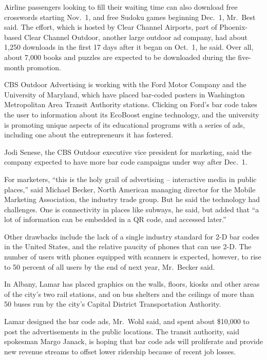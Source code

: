 ﻿\documentclass[12pt]{article}
\begin{document}
Airline passengers looking to fill their waiting time can also download free crosswords starting
Nov.~1, and free Sudoku games beginning Dec.~1, Mr.~Best said. The effort, which is hosted by Clear
Channel Airports, part of Phoenix-based Clear Channel Outdoor, another large outdoor ad company, had
about 1,250 downloads in the first 17 days after it began on Oct.~1, he said. Over all, about 7,000
books and puzzles are expected to be downloaded during the five-month promotion.

CBS Outdoor Advertising is working with the Ford Motor Company and the University of Maryland, which
have placed bar-coded posters in Washington Metropolitan Area Transit Authority stations. Clicking
on Ford's bar code takes the user to information about its EcoBoost engine technology, and the
university is promoting unique aspects of its educational programs with a series of ads, including
one about the entrepreneurs it has fostered.

Jodi Senese, the CBS Outdoor executive vice president for marketing, said the company expected to
have more bar code campaigns under way after Dec.~1.

For marketers, ``this is the holy grail of advertising -- interactive media in public places,'' said
Michael Becker, North American managing director for the Mobile Marketing Association, the industry
trade group. But he said the technology had challenges. One is connectivity in places like subways,
he said, but added that ``a lot of information can be embedded in a QR code, and accessed later.''

Other drawbacks include the lack of a single industry standard for 2-D bar codes in the United
States, and the relative paucity of phones that can use 2-D. The number of users with phones
equipped with scanners is expected, however, to rise to 50 percent of all users by the end of next
year, Mr.~Becker said.

In Albany, Lamar has placed graphics on the walls, floors, kiosks and other areas of the city's two
rail stations, and on bus shelters and the ceilings of more than 50 buses run by the city's Capital
District Transportation Authority.

Lamar designed the bar code ads, Mr.~Wohl said, and spent about \$10,000 to post the advertisements
in the public locations. The transit authority, said spokesman Margo Janack, is hoping that bar code
ads will proliferate and provide new revenue streams to offset lower ridership because of recent job
losses.
\end{document}
